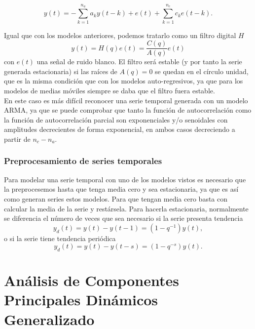 \begin{equation}
y(t) = - \sum_{k=1}^{n_a} a_k y(t-k) + e(t) + \sum_{k=1}^{n_c} c_k e(t-k).
\end{equation}

Igual que con los modelos anteriores, podemos tratarlo como un filtro digital $H$
\[	y(t) = H(q)e(t) = \frac{C(q)}{A(q)}e(t)	\]
con $e(t)$ una señal de ruido blanco. El filtro será estable (y por tanto la serie generada estacionaria) si las raíces de $A(q) = 0$ se quedan en el círculo unidad, que es la misma condición que con los modelos auto-regresivos, ya que para los modelos de medias móviles siempre se daba que el filtro fuera estable.\\

En este caso es más difícil reconocer una serie temporal generada con un modelo ARMA, ya que se puede comprobar que tanto la función de autocorrelación como la función de autocorrelación parcial son exponenciales y/o senoidales con amplitudes decrecientes de forma exponencial, en ambos casos decreciendo a partir de $n_c-n_a$.

\subsubsection{Preprocesamiento de series temporales}

Para modelar una serie temporal con uno de los modelos vistos es necesario que la preprocesemos hasta que tenga media cero y sea estacionaria, ya que es así como generan series estos modelos. Para que tengan media cero basta con calcular la media de la serie y restársela. Para hacerla estacionaria, normalmente se diferencia el número de veces que sea necesario si la serie presenta tendencia
\[	y_d(t) = y(t) - y(t-1) = (1 - q^{-1})y(t),	\]
o si la serie tiene tendencia periódica
\[	y_d(t) = y(t) - y(t-s) = (1 - q^{-s})y(t).	\]


\section{Análisis de Componentes Principales Dinámicos Generalizado}









%
